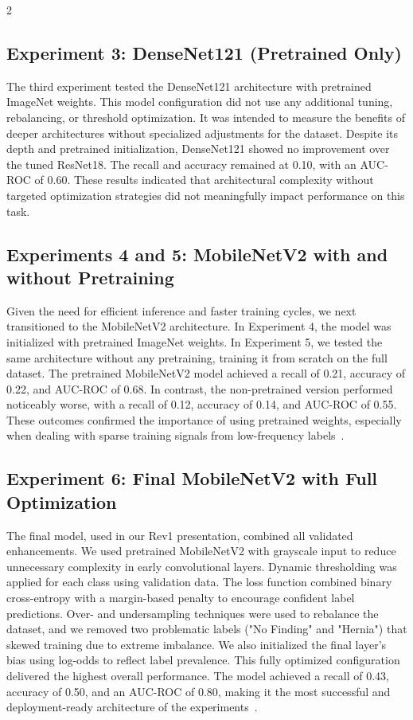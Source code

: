 \documentclass[12pt]{article}
\begin{document}
\begin{multicols}{2}
\subsection{Experiment 3: DenseNet121 (Pretrained Only)}

The third experiment tested the DenseNet121 architecture with pretrained ImageNet weights. This model configuration did not use any additional tuning, rebalancing, or threshold optimization. It was intended to measure the benefits of deeper architectures without specialized adjustments for the dataset.
Despite its depth and pretrained initialization, DenseNet121 showed no improvement over the tuned ResNet18. The recall and accuracy remained at 0.10, with an AUC-ROC of 0.60. These results indicated that architectural complexity without targeted optimization strategies did not meaningfully impact performance on this task.

\subsection{Experiments 4 and 5: MobileNetV2 with and without Pretraining}

Given the need for efficient inference and faster training cycles, we next transitioned to the MobileNetV2 architecture. In Experiment 4, the model was initialized with pretrained ImageNet weights. In Experiment 5, we tested the same architecture without any pretraining, training it from scratch on the full dataset.
The pretrained MobileNetV2 model achieved a recall of 0.21, accuracy of 0.22, and AUC-ROC of 0.68. In contrast, the non-pretrained version performed noticeably worse, with a recall of 0.12, accuracy of 0.14, and AUC-ROC of 0.55. These outcomes confirmed the importance of using pretrained weights, especially when dealing with sparse training signals from low-frequency labels~\cite{howard2019mobilenetv2}.

\subsection{Experiment 6: Final MobileNetV2 with Full Optimization}

The final model, used in our Rev1 presentation, combined all validated enhancements. We used pretrained MobileNetV2 with grayscale input to reduce unnecessary complexity in early convolutional layers. Dynamic thresholding was applied for each class using validation data. The loss function combined binary cross-entropy with a margin-based penalty to encourage confident label predictions. Over- and undersampling techniques were used to rebalance the dataset, and we removed two problematic labels ("No Finding" and "Hernia") that skewed training due to extreme imbalance. We also initialized the final layer's bias using log-odds to reflect label prevalence.
This fully optimized configuration delivered the highest overall performance. The model achieved a recall of 0.43, accuracy of 0.50, and an AUC-ROC of 0.80, making it the most successful and deployment-ready architecture of the experiments~\cite{13}.


\end{multicols}
\end{document}
